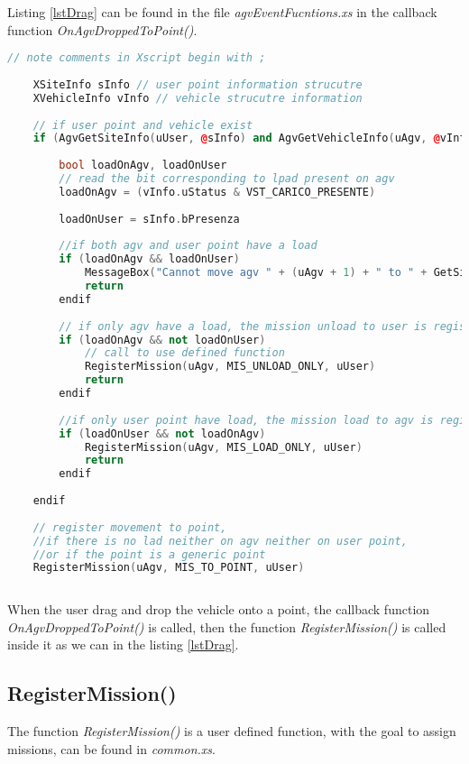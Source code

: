 Listing \ref{lstDrag} can be found in the file \textit{agvEventFucntions.xs} in the callback function \textit{OnAgvDroppedToPoint()}.

\begin{lstlisting}[language=c++, caption= Drag and drop to user point and generic point, label=lstDrag]
	// note comments in Xscript begin with ;
	
	XSiteInfo sInfo // user point information strucutre
	XVehicleInfo vInfo // vehicle strucutre information
	
	// if user point and vehicle exist
	if (AgvGetSiteInfo(uUser, @sInfo) and AgvGetVehicleInfo(uAgv, @vInfo))
	
		bool loadOnAgv, loadOnUser
		// read the bit corresponding to lpad present on agv
		loadOnAgv = (vInfo.uStatus & VST_CARICO_PRESENTE)
		
		loadOnUser = sInfo.bPresenza
		
		//if both agv and user point have a load
		if (loadOnAgv && loadOnUser)
			MessageBox("Cannot move agv " + (uAgv + 1) + " to " + GetSiteName(uUser) + " : both have a trolley")
			return
		endif
		
		// if only agv have a load, the mission unload to user is registered
		if (loadOnAgv && not loadOnUser)
			// call to use defined function
			RegisterMission(uAgv, MIS_UNLOAD_ONLY, uUser)
			return
		endif
		
		//if only user point have load, the mission load to agv is registerd.
		if (loadOnUser && not loadOnAgv)
			RegisterMission(uAgv, MIS_LOAD_ONLY, uUser)
			return
		endif
		
	endif
	
	// register movement to point, 
	//if there is no lad neither on agv neither on user point, 
	//or if the point is a generic point
	RegisterMission(uAgv, MIS_TO_POINT, uUser)
	
\end{lstlisting}

When the user drag and drop the vehicle onto a point, the callback function \textit{OnAgvDroppedToPoint()} is called, then the function \textit{RegisterMission()} is called inside it as we can in the listing \ref{lstDrag}.

\subsection*{RegisterMission()}
The function \textit{RegisterMission()} is a user defined function, with the goal to assign missions, can be found in \textit{common.xs}.

